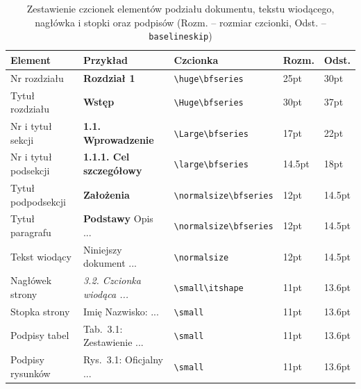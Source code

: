 \begin{table}[htb]
\centering
\caption{Zestawienie czcionek elementów podziału dokumentu, tekstu wiodącego, nagłówka i stopki oraz podpisów (Rozm. -- rozmiar czcionki, Odst. -- \texttt{baselineskip})}
\label{tab:secfonts}\small
\begin{tabularx}{\linewidth}{|ll@{\hskip 5pt}l@{\hskip 5pt}lX|} \hline
Element & Przykład & Czcionka & Rozm. & Odst. \\ \hline\hline
Nr rozdziału & {\huge\bfseries Rozdział 1 } & \verb?\huge\bfseries? & 25pt & 30pt \\
Tytuł rozdziału & {\Huge\bfseries Wstęp } & \verb?\Huge\bfseries? & 30pt & 37pt\\
Nr i tytuł sekcji & {\Large\bfseries 1.1. Wprowadzenie } & \verb?\Large\bfseries? & 17pt & 22pt \\
Nr i tytuł podsekcji & {\large\bfseries 1.1.1. Cel szczegółowy } & \verb?\large\bfseries? &14.5pt & 18pt\\
Tytuł podpodsekcji  & {\normalsize\bfseries Założenia } & \verb?\normalsize\bfseries? & 12pt & 14.5pt\\
Tytuł paragrafu & {\normalsize\bfseries  Podstawy } Opis ... &  \verb?\normalsize\bfseries? & 12pt & 14.5pt\\
Tekst wiodący & {\normalsize Niniejszy dokument ... } & \verb?\normalsize? & 12pt & 14.5pt\\
Nagłówek strony & {\small\itshape 3.2. Czcionka wiodąca ...} & \verb?\small\itshape? & 11pt & 13.6pt \\
Stopka strony & {\small Imię Nazwisko: ...} & \verb?\small? & 11pt & 13.6pt\\
Podpisy tabel & {\small Tab.~3.1: Zestawienie ...} & \verb?\small? & 11pt & 13.6pt \\
Podpisy rysunków & {\small Rys.~3.1: Oficjalny ...} & \verb?\small? & 11pt & 13.6pt\\\hline
\end{tabularx}
\end{table}
